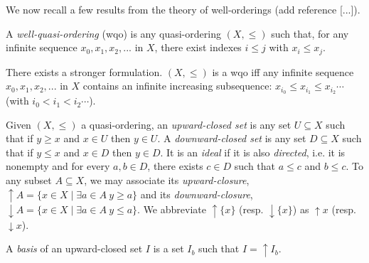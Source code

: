 We now recall a few results from the theory of well-orderings (add reference [...]).


\begin{definition}
 A {\em well-quasi-ordering} (wqo) is any quasi-ordering $(X,\leq)$ such that, for any infinite sequence $x_0, x_1, x_2, ...$ in $X$, there exist indexes $i \leq j$ with $x_i \leq  x_j$.
\end{definition}


There exists a stronger formulation. $(X,\leq)$ is a wqo iff any infinite sequence  $x_0, x_1, x_2, ...$ in $X$ contains an infinite increasing subsequence: $x_{i_0} \leq x_{i_1} \leq x_{i_2} \cdots$ (with $i_0 < i_1 < i_2 \cdots$).

%
\iffalse
%
\begin{lemma}
(Erd\"os and Rado). Assume $\leq$ is a wqo. Then any infinite sequence contains an infinite increasing subsequence: $x_{i_0} \leq x_{i_1} \leq x_{i_2} \cdots$ (with $i_0 < i_1 < i_2 \cdots$).
\end{lemma}


\begin{proof}
Consider an infinite sequence and the set $M = \{i \in N \mid \forall j > i ~ x_i \not\leq x_j \}$. $M$ cannot
be infinite, otherwise it would lead to an infinite subsequence contradicting the wqo
hypothesis. Thus, $M$ is bounded and any $x_i$ with $i$ beyond $M$ can start an infinite
increasing subsequence.
\end{proof}
%
\fi
%

Given $(X,\leq)$ a quasi-ordering, an {\em upward-closed set} is any set $U \subseteq X$ such that if $y \geq x$ and $x \in U$ then $y \in U $.
A {\em downward-closed set} is any set $D \subseteq X$ such that if $y \leq x$ and $x \in D$ then $y \in D $. 
It is an {\em ideal } if it is also {\em directed}, i.e. it is nonempty and for every $a,b \in D$, there exists $c \in D$ such that $a \leq c$ and $b \leq c$.
To any subset $A \subseteq X$, we may associate
its {\em upward-closure},
 $\uparrow A = \{x \in X \mid \exists a \in A ~ y \geq a\}$
 and its 
 {\em downward-closure},
 $\downarrow A = \{x \in X \mid \exists a \in A ~ y \leq a\}$. 
We abbreviate $\uparrow \{x\}$ (resp. $\downarrow \{x\}$)
as $\uparrow x$ (resp. $\downarrow x$).


A {\em basis} of an upward-closed set $I$ is a set $I_b$ such that $I = \uparrow I_b$. 

